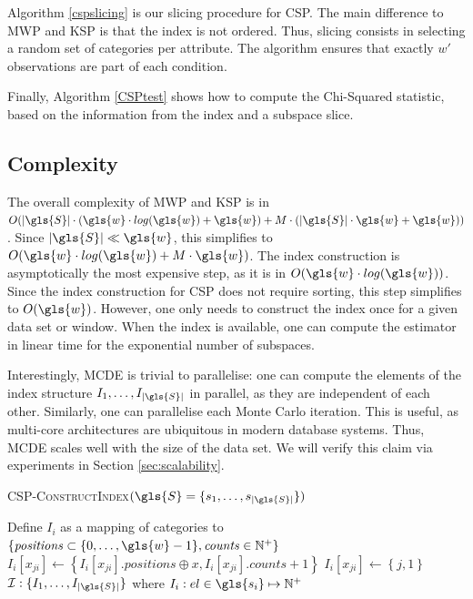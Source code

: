 Algorithm \ref{cspslicing} is our slicing procedure for \gls{CSP}. The main difference to \gls{MWP} and \gls{KSP} is that the index is not ordered. Thus, slicing consists in selecting a random set of categories per attribute. The algorithm ensures that exactly $w'$ observations are part of each condition.

Finally, Algorithm \ref{CSPtest} shows how to compute the Chi-Squared statistic, based on the information from the index and a subspace slice. 

\subsection{Complexity}

The overall complexity of \gls{MWP} and \gls{KSP} is in $O(|\gls{S}| \cdot (\gls{w} \cdot log(\gls{w}) + \gls{w}) + M \cdot(|\gls{S}| \cdot \gls{w} + \gls{w}))$. Since $|\gls{S}| \ll \gls{w}$, this simplifies to $O(\gls{w} \cdot log(\gls{w}) + M\cdot \gls{w})$. The index construction is asymptotically the most expensive step, as it is in $O(\gls{w} \cdot log(\gls{w}))$. Since the index construction for CSP does not require sorting, this step simplifies to $O(\gls{w})$. 
However, one only needs to construct the index once for a given data set or window. When the index is available, one can compute the estimator in linear time for the exponential number of subspaces. 

Interestingly, \gls{MCDE} is trivial to parallelise: one can compute the elements of the index structure $I_1, \dots, I_{|\gls{S}|}$ in parallel, as they are independent of each other. Similarly, one can parallelise each Monte Carlo iteration. This is useful, as multi-core architectures are ubiquitous in modern database systems. 
Thus, \gls{MCDE} scales well with the size of the data set. We will verify this claim via experiments in Section \ref{sec:scalability}.

\begin{algorithm}\footnotesize
	\caption{ \textsc{\gls{CSP}-ConstructIndex}$(\gls{S} = \{s_1, \dots, s_{|\gls{S}|}\})$}\label{cspconstructindex}
	\begin{algorithmic}[1]
		\State Define $I_i$ as a mapping of categories to  $\left\{\mathit{positions} \subset \{0,\dots, \gls{w}-1\}, \mathit{counts} \in  \mathbb{N}^+\right\}$
		\State $I_i[x_{ji}] \gets \left\{ I_i[x_{ji}].\mathit{positions} \oplus x, I_i[x_{ji}].\mathit{counts} + 1 \right\}$
		\Else
		\State   $I_i[x_{ji}] \gets \left\{j, 1 \right\}$
		\EndIf
		\EndFor
		\EndFor
		 $\mathcal{I}: \{I_1, \dots, I_{|\gls{S}|} \}$ where $I_i: el \in \gls{s_i} \mapsto \mathbb{N}^+$
	\end{algorithmic}
\end{algorithm}

